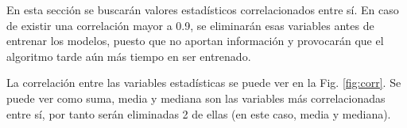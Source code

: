 En esta sección se buscarán valores estadísticos correlacionados entre sí. En caso de existir una correlación mayor a 0.9, se eliminarán esas variables antes de entrenar los modelos, puesto que no aportan información y provocarán que el algoritmo tarde aún más tiempo en ser entrenado.

La correlación entre las variables estadísticas se puede ver en la Fig. \ref{fig:corr}. Se puede ver como suma, media y mediana son las variables más correlacionadas entre sí, por tanto serán eliminadas 2 de ellas (en este caso, media y mediana).

\begin{figure}[htpb!]
    \centering
\end{figure}
